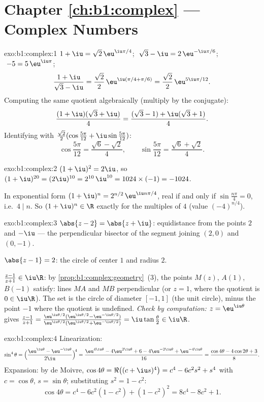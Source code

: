 \section*{Chapter \ref{ch:b1:complex} --- Complex Numbers}

\begin{solution}{exo:b1:complex:1}
$1 + \iu = \sqrt 2\, \eu^{\iu\pi/4}$;
$\;\sqrt 3 - \iu = 2\, \eu^{-\iu\pi/6}$;
$\;-5 = 5\, \eu^{\iu\pi}$;
\[
\frac{1 + \iu}{\sqrt 3 - \iu}
= \frac{\sqrt 2}{2}\, \eu^{\iu(\pi/4 + \pi/6)}
= \frac{\sqrt 2}{2}\, \eu^{5\iu\pi/12}.
\]
Computing the same quotient algebraically (multiply by the conjugate):
\[
\frac{(1 + \iu)(\sqrt 3 + \iu)}{4}
= \frac{(\sqrt 3 - 1) + \iu(\sqrt 3 + 1)}{4}.
\]
Identifying with $\frac{\sqrt 2}{2}(\cos\frac{5\pi}{12} +
\iu\sin\frac{5\pi}{12})$:
\[
\cos\frac{5\pi}{12} = \frac{\sqrt 6 - \sqrt 2}{4},
\qquad
\sin\frac{5\pi}{12} = \frac{\sqrt 6 + \sqrt 2}{4}.
\]
\end{solution}

\begin{solution}{exo:b1:complex:2}
$(1+\iu)^2 = 2\iu$, so $(1+\iu)^{20} = (2\iu)^{10} = 2^{10}\,\iu^{10}
= 1024 \times (-1) = -1024$.

In exponential form $(1+\iu)^n = 2^{n/2}\, \eu^{\iu n\pi/4}$, real if
and only if $\sin\frac{n\pi}{4} = 0$, i.e.\ $4 \mid n$. So $(1+\iu)^n
\in \R$ exactly for the multiples of $4$ (value $(-4)^{n/4}$).
\end{solution}

\begin{solution}{exo:b1:complex:3}
$\abs{z - 2} = \abs{z + \iu}$: equidistance from the points $2$ and
$-\iu$ --- the perpendicular bisector of the segment joining $(2, 0)$
and $(0, -1)$.

$\abs{z - 1} = 2$: the circle of center $1$ and radius $2$.

$\frac{z-1}{z+1} \in \iu\R$: by
\cref{prop:b1:complex:geometry}~(3), the points $M(z)$, $A(1)$,
$B(-1)$ satisfy: lines $MA$ and $MB$ perpendicular (or $z = 1$, where
the quotient is $0 \in \iu\R$). The set is the circle of diameter
$[-1, 1]$ (the unit circle), minus the point $-1$ where the quotient
is undefined. \emph{Check by computation:} $z = \eu^{\iu\theta}$ gives
$\frac{z-1}{z+1} = \frac{\eu^{\iu\theta/2}(\eu^{\iu\theta/2} -
\eu^{-\iu\theta/2})}{\eu^{\iu\theta/2}(\eu^{\iu\theta/2} +
\eu^{-\iu\theta/2})} = \iu\tan\frac\theta2 \in \iu\R$.
\end{solution}

\begin{solution}{exo:b1:complex:4}
Linearization:
\[
\sin^4\theta
= \Bigl(\frac{\eu^{\iu\theta} - \eu^{-\iu\theta}}{2\iu}\Bigr)^{\!4}
= \frac{\eu^{4\iu\theta} - 4\eu^{2\iu\theta} + 6 - 4\eu^{-2\iu\theta}
+ \eu^{-4\iu\theta}}{16}
= \frac{\cos 4\theta - 4\cos 2\theta + 3}{8}.
\]
Expansion: by de Moivre, $\cos 4\theta = \Re\bigl((c +
\iu s)^4\bigr) = c^4 - 6c^2 s^2 + s^4$ with $c = \cos\theta$, $s =
\sin\theta$; substituting $s^2 = 1 - c^2$:
\[
\cos 4\theta = c^4 - 6c^2(1 - c^2) + (1 - c^2)^2
= 8c^4 - 8c^2 + 1 .
\]
\end{solution}

